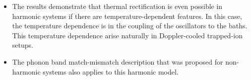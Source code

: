\begin{itemize}
\begin{itemize}
    \item The results demonstrate that thermal rectification is even possible in
    harmonic systems if there are temperature-dependent features. In this case, the
    temperature dependence is in the coupling of the oscillators to the baths. This
    temperature dependence arise naturally in Doppler-cooled trapped-ion setups.

    \item The phonon band match-mismatch description that was proposed for non-harmonic
    systems also applies to this harmonic model.
  \end{itemize}

\end{itemize}

